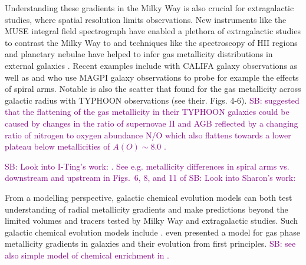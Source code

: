 \documentclass[fleqn,usenatbib]{mnras}
\newcommand{\SB}[1]{{\textcolor{purple}{SB: #1}}}
\begin{document}
Understanding these gradients in the Milky Way is also crucial for extragalactic studies, where spatial resolution limits observations. New instruments like the MUSE integral field spectrograph have enabled a plethora of extragalactic studies to contrast the Milky Way to and techniques like the spectroscopy of HII regions and planetary nebulae have helped to infer gas metallicity distributions in external galaxies \citep{Shaver1983, Vilchez1996, Rolleston2000, Bresolin2012}. Recent examples include \citet{Sanchez2014} with CALIFA galaxy observations as well as \citet{Mun2024} and \citet{Chen2024} who use MAGPI galaxy observations to probe for example the effects of spiral arms. Notable is also the scatter that \citet{Chen2023} found for the gas metallicity across galactic radius with TYPHOON observations (see their. Figs. 4-6). \SB{\citet{Grasha2022} suggested that the flattening of the gas metallicity in their TYPHOON galaxies could be caused by changes in the ratio of supernovae II and AGB reflected by a changing ratio of nitrogen to oxygen abundance N/O which also flattens towards a lower plateau below metallicities of $A(O) \sim 8.0$ \citep{Nicholls2017}.}

\SB{Look into I-Ting's work: \citet{Ho2015, Ho2017c, Ho2018, Ho2019}. See e.g. metallicity differences in spiral arms vs. downstream and upstream in Figs.~6, 8, and 11 of \citet{Ho2017c}}
\SB{Look into Sharon's work: \citet{Meidt2008, Meidt2009}}

From a modelling perspective, galactic chemical evolution models can both test understanding of radial metallicity gradients and make predictions beyond the limited volumes and tracers tested by Milky Way and extragalactic studies. Such galactic chemical evolution models include \citet{Chiappini2001, Matteucci2001b, Minchev2014b, Kubryk2015, Stanghellini2015, Rybizki2017}. \citet{Sharda2021} even presented a model for gas phase metallicity gradients in galaxies and their evolution from first principles. \SB{see also simple model of chemical enrichment in \citet{Ho2017c}.}
\end{document}
